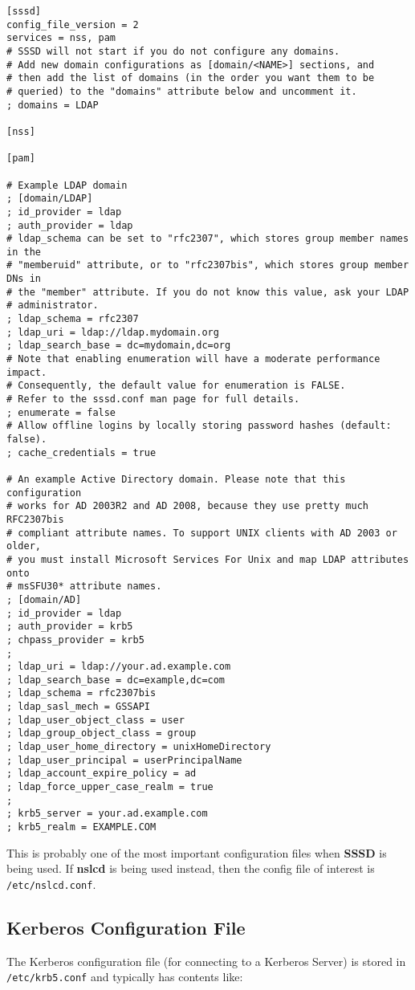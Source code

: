 \vspace{-15pt}
\begin{verbatim}
[sssd]
config_file_version = 2
services = nss, pam
# SSSD will not start if you do not configure any domains.
# Add new domain configurations as [domain/<NAME>] sections, and
# then add the list of domains (in the order you want them to be
# queried) to the "domains" attribute below and uncomment it.
; domains = LDAP

[nss]

[pam]

# Example LDAP domain
; [domain/LDAP]
; id_provider = ldap
; auth_provider = ldap
# ldap_schema can be set to "rfc2307", which stores group member names in the
# "memberuid" attribute, or to "rfc2307bis", which stores group member DNs in
# the "member" attribute. If you do not know this value, ask your LDAP
# administrator.
; ldap_schema = rfc2307
; ldap_uri = ldap://ldap.mydomain.org
; ldap_search_base = dc=mydomain,dc=org
# Note that enabling enumeration will have a moderate performance impact.
# Consequently, the default value for enumeration is FALSE.
# Refer to the sssd.conf man page for full details.
; enumerate = false
# Allow offline logins by locally storing password hashes (default: false).
; cache_credentials = true

# An example Active Directory domain. Please note that this configuration
# works for AD 2003R2 and AD 2008, because they use pretty much RFC2307bis
# compliant attribute names. To support UNIX clients with AD 2003 or older,
# you must install Microsoft Services For Unix and map LDAP attributes onto
# msSFU30* attribute names.
; [domain/AD]
; id_provider = ldap
; auth_provider = krb5
; chpass_provider = krb5
;
; ldap_uri = ldap://your.ad.example.com
; ldap_search_base = dc=example,dc=com
; ldap_schema = rfc2307bis
; ldap_sasl_mech = GSSAPI
; ldap_user_object_class = user
; ldap_group_object_class = group
; ldap_user_home_directory = unixHomeDirectory
; ldap_user_principal = userPrincipalName
; ldap_account_expire_policy = ad
; ldap_force_upper_case_realm = true
;
; krb5_server = your.ad.example.com
; krb5_realm = EXAMPLE.COM
\end{verbatim}
\vspace{-10pt}

\noindent
This is probably one of the most important configuration files when \textbf{SSSD} is being used. If \textbf{nslcd} is being used instead, then the config file of interest is \verb|/etc/nslcd.conf|.

\subsection{Kerberos Configuration File}
The Kerberos configuration file (for connecting to a Kerberos Server) is stored in \verb|/etc/krb5.conf| and typically has contents like:

